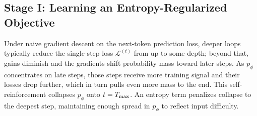 \documentclass[]{bytedance_seed}
\newcommand{\1}{\mathbf{1}}
\newcommand{\ut}{LoopLM}
\begin{document}

\subsection{Stage I: Learning an Entropy-Regularized Objective}\label{sec:entropy}

Under naive gradient descent on the next-token prediction loss, deeper loops typically reduce the single-step loss $\mathcal{L}^{(t)}$ from  up to some depth; beyond that, gains diminish and the gradients shift probability mass toward later steps. As $p_{\phi}$ concentrates on late steps, those steps receive more training signal and their losses drop further, which in turn pulls even more mass to the end. This self-reinforcement collapses $p_{\phi}$ onto $t=T_{\rm max}$. An entropy term penalizes collapse to the deepest step, maintaining enough spread in $p_\phi$ to reflect input difficulty. 
\end{document}
